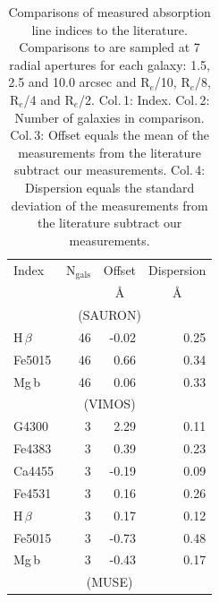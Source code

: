 \documentclass[a4paper,fleqn,usenatbib]{mnras}
\begin{document}
		\begin{table}
			\centering
			\caption{Comparisons of measured absorption line indices to the literature. Comparisons to \citet{Rampazzo2005} are sampled at 7 radial apertures for each galaxy: 1.5, 2.5 and 10.0 arcsec and R$_e$/10, R$_e$/8, R$_e$/4 and R$_e$/2. Col.\,1: Index. Col.\,2: Number of galaxies in comparison. Col.\,3: Offset equals the mean of the measurements from the literature subtract our measurements. Col.\,4: Dispersion equals the standard deviation of the measurements from the literature subtract our measurements.}
			\label{tab:litAbsorption}
			\begin{tabular}{l r r r}
				\hline
				\hline
				Index 		& \multicolumn{1}{c}{N$_\mathrm{gals}$} & \multicolumn{1}{c}{Offset} & \multicolumn{1}{c}{Dispersion} \\
							& 		&\multicolumn{1}{c}{\AA}& \multicolumn{1}{c}{\AA} \\
				\hline
				\multicolumn{4}{c}{\citet{Vazdekis2010} (SAURON)} \\
				\hline
				H\,$\beta$ 	& 46		& -0.02\leavevmode\phantom{0}& 0.25\leavevmode\phantom{0}	\\
				Fe5015		& 46		& 0.66\leavevmode\phantom{0}& 0.34\leavevmode\phantom{0}	\\
				Mg\,b 		& 46		& 0.06\leavevmode\phantom{0}& 0.33\leavevmode\phantom{0}	\\
				\hline
				\multicolumn{4}{c}{\citet{Rampazzo2005} (VIMOS)} \\
				\hline
				G4300 		& 3 		& 2.29\leavevmode\phantom{0}& 0.11\leavevmode\phantom{0}	\\
				Fe4383 		& 3 		& 0.39\leavevmode\phantom{0}& 0.23\leavevmode\phantom{0}	\\
				Ca4455 		& 3 		& -0.19\leavevmode\phantom{0}& 0.09\leavevmode\phantom{0}	\\
				Fe4531 		& 3 		& 0.16\leavevmode\phantom{0}& 0.26\leavevmode\phantom{0}	\\
				H\,$\beta$ 	& 3 		& 0.17\leavevmode\phantom{0}& 0.12\leavevmode\phantom{0}	\\
				Fe5015 		& 3 		& -0.73\leavevmode\phantom{0}& 0.48\leavevmode\phantom{0}	\\
				Mg\,b 		& 3 		& -0.43\leavevmode\phantom{0}& 0.17\leavevmode\phantom{0}	\\
				\hline
				\multicolumn{4}{c}{\citet{Rampazzo2005} (MUSE)} \\

\end{tabular}
\end{table}
\end{document}

